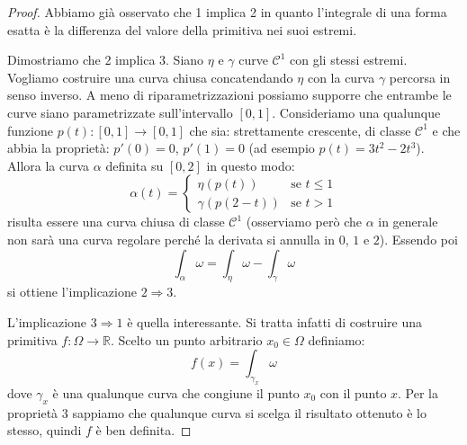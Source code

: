 \documentclass[italian,a4paper]{scrartcl}
\newcommand{\RR}{{\mathbb R}}
\begin{document}
\begin{proof}
Abbiamo già osservato che 1 implica 2 in quanto l'integrale di
una forma esatta è la differenza del valore della primitiva nei suoi estremi.

Dimostriamo che 2 implica 3. Siano $\eta$ e $\gamma$ curve
$\mathcal C^1$ con gli stessi estremi. Vogliamo costruire una curva
chiusa concatendando $\eta$ con la curva $\gamma$ percorsa in senso
inverso. A meno di riparametrizzazioni possiamo supporre che entrambe
le curve siano parametrizzate sull'intervallo $[0,1]$. Consideriamo
una qualunque funzione $p(t)\colon [0,1]\to [0,1]$ che sia:
strettamente crescente, di classe $\mathcal C^1$ e che abbia la
proprietà: $p'(0)=0$, $p'(1)=0$ (ad esempio $p(t)=3t^2-2t^3$). Allora
la curva $\alpha$ definita su $[0,2]$ in questo modo:
\[
\alpha(t) = 
\begin{cases}
  \eta(p(t)) & \text{se $t\le 1$} \\
  \gamma(p(2-t)) & \text{se $t> 1$}
\end{cases}
\]
risulta essere una curva chiusa di classe $\mathcal C^1$ (osserviamo
però che $\alpha$ in generale non sarà una curva regolare perché la
derivata si annulla in $0$, $1$ e $2$). Essendo poi
\[
\int_\alpha \omega = \int_\eta \omega - \int_\gamma \omega
\]
si ottiene l'implicazione $2 \Rightarrow 3$.

L'implicazione $3 \Rightarrow 1$ è quella interessante. Si
tratta infatti di costruire una primitiva $f\colon \Omega\to \RR$.
Scelto un punto arbitrario $x_0\in \Omega$ definiamo:
\[
f(x) = \int_{\gamma_x} \omega
\]
dove $\gamma_x$ è una qualunque curva che congiune il punto $x_0$ con
il punto $x$. Per la proprietà 3 sappiamo che qualunque curva si
scelga il risultato ottenuto è lo stesso, quindi $f$ è ben definita.


\end{proof}
\end{document}
